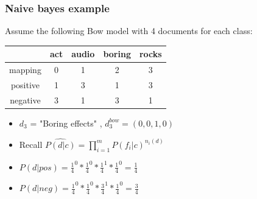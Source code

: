 \documentclass{beamer}
\begin{document}
\begin{frame}
	\frametitle{Naive bayes example}
	Assume the following Bow model with 4 documents for each class:
	\begin{center}
		\begin{table}
			\begin{tabular}{c|c|c|c|c}
				& act & audio & boring & rocks \\ \hline \hline
				mapping & 0 & 1 & 2 & 3 \\ \hline
				positive & 1 & 3 & 1 & 3 \\
				negative & 3 & 1 & 3 & 1
			\end{tabular}
		\end{table}
	\end{center}
	\pause
	\begin{itemize}
		\item $d_3$ = "Boring effects" , $d_3^{bow}=(0,0,1,0)$ \pause
		\item Recall $\widehat{P(d|c)}=\prod_{i=1}^{m}P(f_i|c)^{n_i(d)}$ \pause
		\item $P(d|pos)=\frac{1}{4}^0*\frac{1}{4}^0*\frac{1}{4}^1*\frac{1}{4}^0=\frac{1}{4}$ \pause
		\item $P(d|neg)=\frac{1}{4}^0*\frac{1}{4}^0*\frac{3}{4}^1*\frac{1}{4}^0=\frac{3}{4}$
	\end{itemize}
\end{frame}
\end{document}
